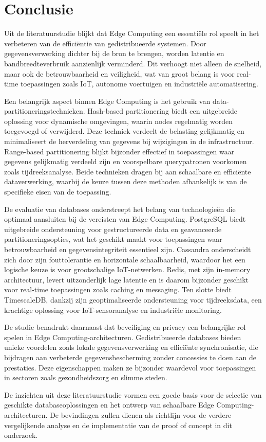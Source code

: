 \section{Conclusie}

Uit de literatuurstudie blijkt dat Edge Computing een essentiële rol speelt in het verbeteren van de efficiëntie van gedistribueerde systemen. Door gegevensverwerking dichter bij de bron te brengen, worden latentie en bandbreedteverbruik aanzienlijk verminderd. Dit verhoogt niet alleen de snelheid, maar ook de betrouwbaarheid en veiligheid, wat van groot belang is voor real-time toepassingen zoals IoT, autonome voertuigen en industriële automatisering.

Een belangrijk aspect binnen Edge Computing is het gebruik van data-partitioneringstechnieken. Hash-based partitionering biedt een uitgebreide oplossing voor dynamische omgevingen, waarin nodes regelmatig worden toegevoegd of verwijderd. Deze techniek verdeelt de belasting gelijkmatig en minimaliseert de herverdeling van gegevens bij wijzigingen in de infrastructuur. Range-based partitionering blijkt bijzonder effectief in toepassingen waar gegevens gelijkmatig verdeeld zijn en voorspelbare querypatronen voorkomen zoals tijdreeksanalyse. Beide technieken dragen bij aan schaalbare en efficiënte dataverwerking, waarbij de keuze tussen deze methoden afhankelijk is van de specifieke eisen van de toepassing.

De evaluatie van databases onderstreept het belang van technologieën die optimaal aansluiten bij de vereisten van Edge Computing. PostgreSQL biedt uitgebreide ondersteuning voor gestructureerde data en geavanceerde partitioneringsopties, wat het geschikt maakt voor toepassingen waar betrouwbaarheid en gegevensintegriteit essentieel zijn. Cassandra onderscheidt zich door zijn fouttolerantie en horizontale schaalbaarheid, waardoor het een logische keuze is voor grootschalige IoT-netwerken. Redis, met zijn in-memory architectuur, levert uitzonderlijk lage latentie en is daarom bijzonder geschikt voor real-time toepassingen zoals caching en messaging. Ten slotte biedt TimescaleDB, dankzij zijn geoptimaliseerde ondersteuning voor tijdreeksdata, een krachtige oplossing voor IoT-sensoranalyse en industriële monitoring.

De studie benadrukt daarnaast dat beveiliging en privacy een belangrijke rol spelen in Edge Computing-architecturen. Gedistribueerde databases bieden unieke voordelen zoals lokale gegevensverwerking en efficiënte synchronisatie, die bijdragen aan verbeterde gegevensbescherming zonder concessies te doen aan de prestaties. Deze eigenschappen maken ze bijzonder waardevol voor toepassingen in sectoren zoals gezondheidszorg en slimme steden.

De inzichten uit deze literatuurstudie vormen een goede basis voor de selectie van geschikte databaseoplossingen en het ontwerp van schaalbare Edge Computing-architecturen. De bevindingen zullen dienen als richtlijn voor de verdere vergelijkende analyse en de implementatie van de proof of concept in dit onderzoek.